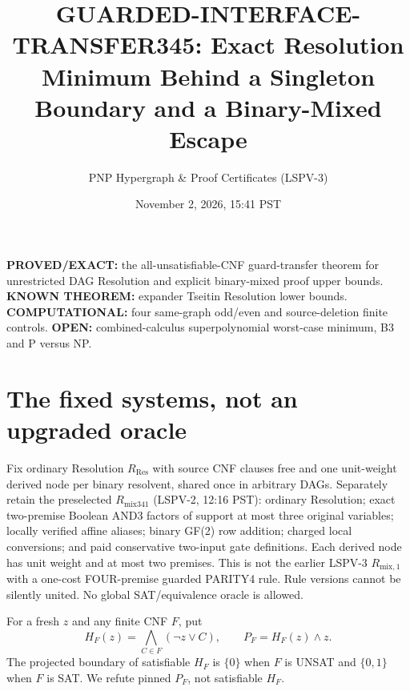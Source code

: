 \documentclass[11pt]{article}
\title{GUARDED-INTERFACE-TRANSFER345: Exact Resolution Minimum Behind a Singleton Boundary and a Binary-Mixed Escape}
\author{PNP Hypergraph \& Proof Certificates (LSPV-3)}
\date{November 2, 2026, 15:41 PST}
\begin{document}
\maketitle
\noindent\textbf{PROVED/EXACT:} the all-unsatisfiable-CNF guard-transfer theorem for unrestricted DAG Resolution and explicit binary-mixed proof upper bounds. \textbf{KNOWN THEOREM:} expander Tseitin Resolution lower bounds. \textbf{COMPUTATIONAL:} four same-graph odd/even and source-deletion finite controls. \textbf{OPEN:} combined-calculus superpolynomial worst-case minimum, B3 and P versus NP.

\section*{The fixed systems, not an upgraded oracle}
Fix ordinary Resolution $R_{\mathrm{Res}}$ with source CNF clauses free and one unit-weight derived node per binary resolvent, shared once in arbitrary DAGs. Separately retain the preselected $R_{\mathrm{mix341}}$ (LSPV-2, 12:16 PST): ordinary Resolution; exact two-premise Boolean AND3 factors of support at most three original variables; locally verified affine aliases; binary GF(2) row addition; charged local conversions; and paid conservative two-input gate definitions. Each derived node has unit weight and at most two premises. This is not the earlier LSPV-3 $R_{\mathrm{mix},1}$ with a one-cost FOUR-premise guarded PARITY4 rule. Rule versions cannot be silently united. No global SAT/equivalence oracle is allowed.

For a fresh $z$ and any finite CNF $F$, put
\[
 H_F(z)=\bigwedge_{C\in F}(\neg z\vee C),\qquad P_F=H_F(z)\wedge z.
\]
The projected boundary of satisfiable $H_F$ is $\{0\}$ when $F$ is UNSAT and $\{0,1\}$ when $F$ is SAT. We refute pinned $P_F$, not satisfiable $H_F$.
\end{document}
